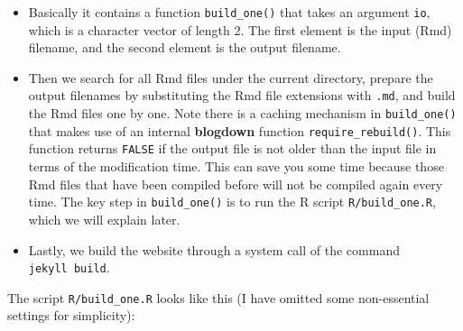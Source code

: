 \documentclass[12pt,]{krantz}
\makeatletter
\newenvironment{Shaded}{\begin{snugshade}}{\end{snugshade}}
\newcommand{\KeywordTok}[1]{\textcolor[rgb]{0.13,0.29,0.53}{\textbf{#1}}}
\newcommand{\DataTypeTok}[1]{\textcolor[rgb]{0.13,0.29,0.53}{#1}}
\newcommand{\DecValTok}[1]{\textcolor[rgb]{0.00,0.00,0.81}{#1}}
\newcommand{\StringTok}[1]{\textcolor[rgb]{0.31,0.60,0.02}{#1}}
\newcommand{\CommentTok}[1]{\textcolor[rgb]{0.56,0.35,0.01}{\textit{#1}}}
\newcommand{\OtherTok}[1]{\textcolor[rgb]{0.56,0.35,0.01}{#1}}
\newcommand{\OperatorTok}[1]{\textcolor[rgb]{0.81,0.36,0.00}{\textbf{#1}}}
\newcommand{\NormalTok}[1]{#1}
\newenvironment{kframe}{%
\medskip{}
\setlength{\fboxsep}{.8em}
 \def\at@end@of@kframe{}%
 \ifinner\ifhmode%
  \def\at@end@of@kframe{\end{minipage}}%
  \begin{minipage}{\columnwidth}%
 \fi\fi%
 \def\FrameCommand##1{\hskip\@totalleftmargin \hskip-\fboxsep
 \colorbox{shadecolor}{##1}\hskip-\fboxsep
     \hskip-\linewidth \hskip-\@totalleftmargin \hskip\columnwidth}%
 \MakeFramed {\advance\hsize-\width
   \@totalleftmargin\z@ \linewidth\hsize
   \@setminipage}}%
 {\par\unskip\endMakeFramed%
 \at@end@of@kframe}
\renewenvironment{Shaded}{\begin{kframe}}{\end{kframe}}
\theoremstyle{definition}
\theoremstyle{definition}
\theoremstyle{definition}
\theoremstyle{remark}
\makeatother
\begin{document}
\begin{itemize}
\item
  Basically it contains a function
  \texttt{build\_one()} that takes an argument \texttt{io}, which is a
  character vector of length 2. The first element is the input (Rmd)
  filename, and the second element is the output filename.
\item
  Then we search for all Rmd files under the current directory, prepare
  the output filenames by substituting the Rmd file extensions with
  \texttt{.md}, and build the Rmd files one by one. Note there is a
  caching mechanism in \texttt{build\_one()} that makes use of an
  internal \textbf{blogdown} function \texttt{require\_rebuild()}. This
  function returns \texttt{FALSE} if the output file is not older than
  the input file in terms of the modification time. This can save you
  some time because those Rmd files that have been compiled before will
  not be compiled again every time. The key step in
  \texttt{build\_one()} is to run the R script \texttt{R/build\_one.R},
  which we will explain later.
\item
  Lastly, we build the website through a system call of the command
  \texttt{jekyll\ build}.
\end{itemize}

The script \texttt{R/build\_one.R} looks like this (I have omitted some
non-essential settings for simplicity):

\begin{Shaded}
\end{Shaded}
\end{document}
